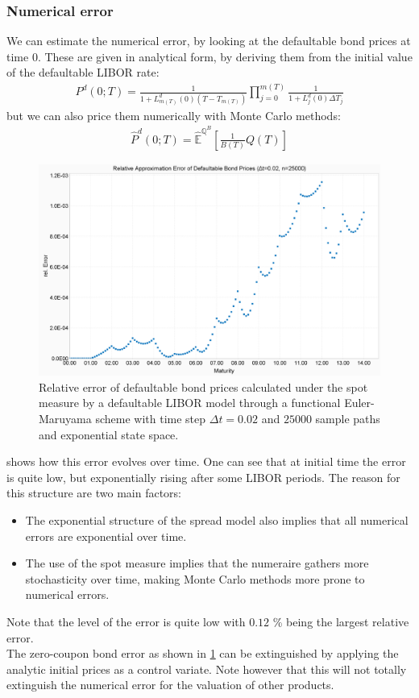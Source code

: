 \documentclass[12pt]{article}
\begin{document}
	\subsubsection{Numerical error}
	We can estimate the numerical error, by looking at the defaultable bond prices at time 0. These are given in analytical form, by deriving them from the initial value of the defaultable LIBOR rate: 
	\begin{align*}
		P^d(0;T) = \frac{1}{1+L^d_{m(T)}(0)\left(T - T_{m(T)}\right)}\prod_{j=0}^{m(T)}\frac{1}{1+L^d_j(0)\Delta T_j}
	\end{align*}
	but we can also price them numerically with Monte Carlo methods:
	\begin{align*}
		\hat{P}^d(0;T) = \hat{\mathbb{E}}^{\mathbb{Q}^B}\left[\frac{1}{B(T)}Q(T)\right]
	\end{align*}
	\begin{figure}[h!]
		\centering
		\includegraphics[width=0.7\linewidth]{figures/Today/BondPriceError_rel}
		\caption{Relative error of defaultable bond prices calculated under the spot measure by a defaultable LIBOR model through a functional Euler-Maruyama scheme with time step $\Delta t=0.02$ and $25000$ sample paths and exponential state space.}
		\label{fig:bondpriceerrorrel}
	\end{figure}
	 shows how this error evolves over time. One can see that at initial time the error is quite low, but exponentially rising after some LIBOR periods. The reason for this structure are two main factors: 
	\begin{itemize}
		\item The exponential structure of the spread model also implies that all numerical errors are exponential over time.
		\item The use of the spot measure implies that the numeraire gathers more stochasticity over time, making Monte Carlo methods more prone to numerical errors.
	\end{itemize}
	Note that the level of the error is quite low with $0.12$ \% being the largest relative error.\\
	The zero-coupon bond error as shown in \cref{fig:bondpriceerrorrel} can be extinguished by applying the analytic initial prices as a control variate. Note however that this will not totally extinguish the numerical error for the valuation of other products.\\
		
\end{document}
